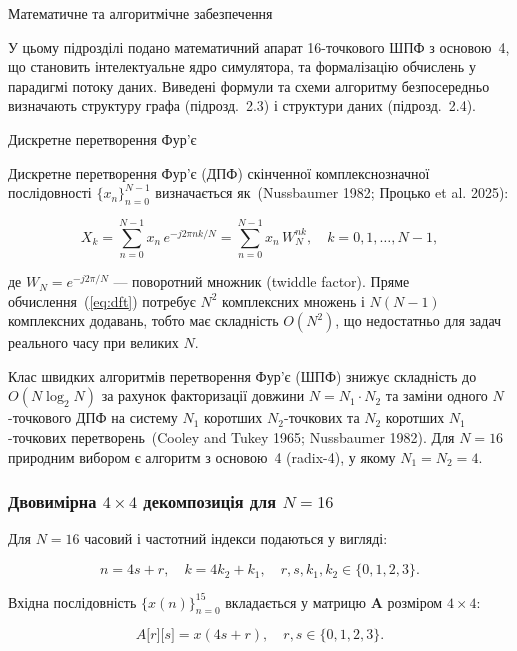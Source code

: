\protect{}\label{_Toc228121450}{}Математичне та
алгоритмічне забезпечення

У цьому підрозділі подано математичний апарат 16-точкового ШПФ з
основою~4, що становить інтелектуальне ядро симулятора, та формалізацію
обчислень у парадигмі потоку даних. Виведені формули та схеми алгоритму
безпосередньо визначають структуру графа (підрозд.~2.3) і структури
даних (підрозд.~2.4).

Дискретне перетворення Фур'є

Дискретне перетворення Фур'є (ДПФ) скінченної комплекснозначної
послідовності \(\{ x_{n}\}_{n = 0}^{N - 1}\) визначається як~(Nussbaumer
1982; Процько et al. 2025):

\[X_{k} = \sum_{n = 0}^{N - 1}x_{n}\, e^{- j2\pi nk/N} = \sum_{n = 0}^{N - 1}x_{n}\, W_{N}^{nk},\quad k = 0,1,\ldots,N - 1,\]

де \(W_{N} = e^{- j2\pi/N}\) --- поворотний множник (twiddle factor).
Пряме обчислення~(\hyperref[eq:dft]{{[}eq:dft{]}}) потребує \(N^{2}\)
комплексних множень і \(N(N - 1)\) комплексних додавань, тобто має
складність \(O(N^{2})\), що недостатньо для задач реального часу при
великих \(N\).

Клас швидких алгоритмів перетворення Фур'є (ШПФ) знижує складність до
\(O(N\log_{2}N)\) за рахунок факторизації довжини
\(N = N_{1} \cdot N_{2}\) та заміни одного \(N\)-точкового ДПФ на
систему \(N_{1}\) коротших \(N_{2}\)-точкових та \(N_{2}\) коротших
\(N_{1}\)-точкових перетворень~(Cooley and Tukey 1965; Nussbaumer 1982).
Для \(N = 16\) природним вибором є алгоритм з основою~4 (radix-4), у
якому \(N_{1} = N_{2} = 4\).

\subsubsection{\texorpdfstring{Двовимірна \(4 \times 4\) декомпозиція
для
\(N = 16\)}{Двовимірна 4 \textbackslash times 4 декомпозиція для N = 16}}\label{ux434ux432ux43eux432ux438ux43cux456ux440ux43dux430-4-times-4-ux434ux435ux43aux43eux43cux43fux43eux437ux438ux446ux456ux44f-ux434ux43bux44f-n-16}

Для \(N = 16\) часовий і частотний індекси подаються у вигляді:

\[n = 4s + r,\quad k = 4k_{2} + k_{1},\quad r,s,k_{1},k_{2} \in \{ 0,1,2,3\}.\]

Вхідна послідовність \(\{ x(n)\}_{n = 0}^{15}\) вкладається у матрицю
\(\mathbf{A}\) розміром \(4 \times 4\):

\[A\lbrack r\rbrack\lbrack s\rbrack = x(4s + r),\quad r,s \in \{ 0,1,2,3\}.\]


